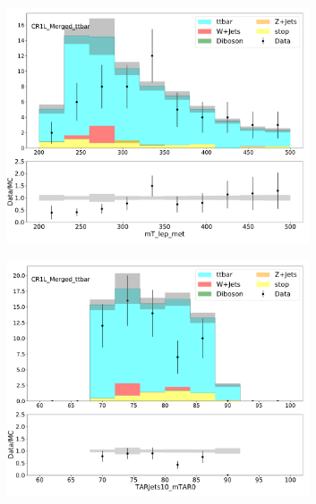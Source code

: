 \begin{figure}[htbp]
  \centering

     \begin{subfigure}{0.49\textwidth}
     \includegraphics[width = 0.98\textwidth]{Figures/4/datamc/CR1L_Merged_ttbar/mT_lep_met.pdf}
     \caption{\mtlepmet}
     \end{subfigure}
     \begin{subfigure}{0.49\textwidth}
     \includegraphics[width = 0.98\textwidth]{Figures/4/datamc/CR1L_Merged_ttbar/TARJets10_mTAR0.pdf}
     \caption{\mTAR}
     \end{subfigure}
     \begin{subfigure}{0.49\textwidth}

\end{subfigure}
\end{figure}
